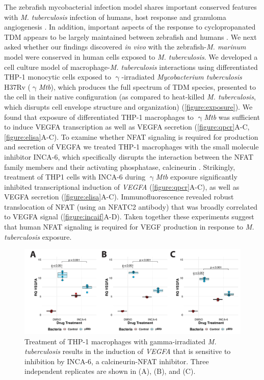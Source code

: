 The zebrafish mycobacterial infection model shares important conserved features with \textit{M. tuberculosis} infection of humans, host response and granuloma angiogenesis \citep{Swaim2006, Datta2015, Oehlers2015, Cronan2021}. In addition, important aspects of the response to cyclopropanated TDM appears to be largely maintained between zebrafish and humans \citep{Walton2018, Rao2005}. We next asked whether our findings discovered \textit{in vivo} with the zebrafish-\textit{M. marinum} model were conserved in human cells exposed to \textit{M. tuberculosis}. We developed a cell culture model of macrophage-\textit{M. tuberculosis} interactions using differentiated THP-1 monocytic cells exposed to $\upgamma$-irradiated \textit{Mycobacterium tuberculosis} H37Rv ($\upgamma$\textit{Mtb}), which produces the full spectrum of TDM species, presented to the cell in their native configuration (as compared to heat-killed \textit{M. tuberculosis}, which disrupts cell envelope structure and organization) \citep{Romero2014, SecanellaFandos2014} (\autoref{figure:exposure}). We found that exposure of differentiated THP-1 macrophages to $\upgamma$\textit{Mtb} was sufficient to induce VEGFA transcription as well as VEGFA secretion (\autoref{figure:qpcr}A-C, \autoref{figure:elisa}A-C). To examine whether NFAT signaling is required for production and secretion of VEGFA we treated THP-1 macrophages with the small molecule inhibitor INCA-6, which specifically disrupts the interaction between the NFAT family members and their activating phosphatase, calcineurin \citep{Roehrl2004}. Strikingly, treatment of THP1 cells with INCA-6 during $\upgamma$\textit{Mtb} exposure significantly inhibited transcriptional induction of \textit{VEGFA} (\autoref{figure:qpcr}A-C), as well as VEGFA secretion (\autoref{figure:elisa}A-C). Immunofluorescence revealed robust translocation of NFAT (using an NFATC2 antibody) that was broadly correlated to VEGFA signal (\autoref{figure:incaif}A-D). Taken together these experiments suggest that human NFAT signaling is required for VEGF production in response to \textit{M. tuberculosis} exposure.

\begin{figure}
\centering
\includegraphics[width=\textwidth]{images/incaqpcr.pdf}
\caption{Treatment of THP-1 macrophages with gamma-irradiated \textit{M. tuberculosis} results in the induction of \textit{VEGFA} that is sensitive to inhibition by INCA-6, a calcineurin-NFAT inhibitor. Three independent replicates are shown in (A), (B), and (C).}
\label{figure:qpcr}

\end{figure}

